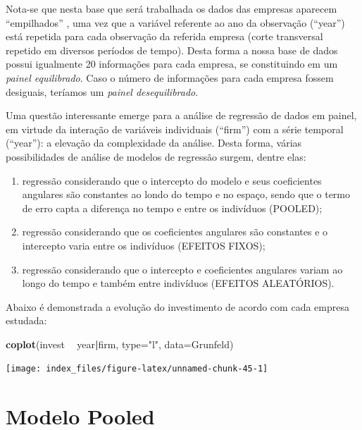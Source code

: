 \documentclass[12pt,brazil,oneside]{book}
\newenvironment{Shaded}{\begin{snugshade}}{\end{snugshade}}
\newcommand{\DataTypeTok}[1]{\textcolor[rgb]{0.13,0.29,0.53}{#1}}
\newcommand{\KeywordTok}[1]{\textcolor[rgb]{0.13,0.29,0.53}{\textbf{#1}}}
\newcommand{\NormalTok}[1]{#1}
\newcommand{\OperatorTok}[1]{\textcolor[rgb]{0.81,0.36,0.00}{\textbf{#1}}}
\newcommand{\StringTok}[1]{\textcolor[rgb]{0.31,0.60,0.02}{#1}}
\begin{document}
Nota-se que nesta base que será trabalhada os dados das empresas
aparecem ``empilhados'' , uma vez que a variável referente ao ano da
observação (``year'') está repetida para cada observação da referida
empresa (corte transversal repetido em diversos períodos de tempo).
Desta forma a nossa base de dados possui igualmente 20 informações para
cada empresa, se constituindo em um \emph{painel equilibrado}. Caso o
número de informações para cada empresa fossem desiguais, teríamos um
\emph{painel desequilibrado}.

Uma questão interessante emerge para a análise de regressão de dados em
painel, em virtude da interação de variáveis individuais (``firm'') com
a série temporal (``year''): a elevação da complexidade da análise.
Desta forma, várias possibilidades de análise de modelos de regressão
surgem, dentre elas:

\begin{enumerate}
\def\labelenumi{\alph{enumi})}
\item
  regressão considerando que o intercepto do modelo e seus coeficientes
  angulares são constantes ao londo do tempo e no espaço, sendo que o
  termo de erro capta a diferença no tempo e entre os indivíduos
  (POOLED);
\item
  regressão considerando que os coeficientes angulares são constantes e
  o intercepto varia entre os indivíduos (EFEITOS FIXOS);
\item
  regressão considerando que o intercepto e coeficientes angulares
  variam ao longo do tempo e também entre indivíduos (EFEITOS
  ALEATÓRIOS).
\end{enumerate}

Abaixo é demonstrada a evolução do investimento de acordo com cada
empresa estudada:

\begin{Shaded}
\begin{Highlighting}[]
\KeywordTok{coplot}\NormalTok{(invest }\OperatorTok{~}\StringTok{ }\NormalTok{year}\OperatorTok{|}\NormalTok{firm, }\DataTypeTok{type=}\StringTok{"l"}\NormalTok{, }\DataTypeTok{data=}\NormalTok{Grunfeld)}
\end{Highlighting}
\end{Shaded}

\begin{center}\texttt{[image: index\_files/figure-latex/unnamed-chunk-45-1]} \end{center}

\hypertarget{modelo-pooled}{%
\section{Modelo Pooled}\label{modelo-pooled}}
\end{document}
